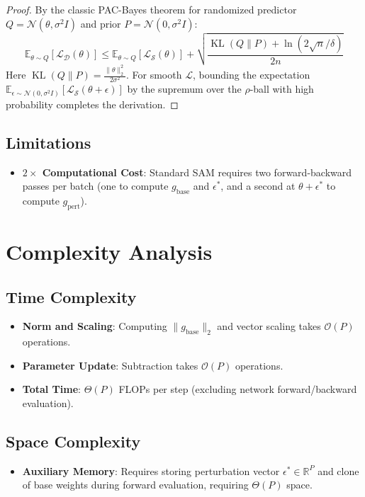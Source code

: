 \documentclass[11pt,a4paper]{article}
\theoremstyle{definition}
\begin{document}
\begin{proof}
By the classic PAC-Bayes theorem for randomized predictor $Q = \mathcal{N}(\theta, \sigma^2 I)$ and prior $P = \mathcal{N}(0, \sigma^2 I)$:
\begin{equation}
\mathbb{E}_{\theta \sim Q}[\mathcal{L}_{\mathcal{D}}(\theta)] \le \mathbb{E}_{\theta \sim Q}[\mathcal{L}_{\mathcal{S}}(\theta)] + \sqrt{\frac{\operatorname{KL}(Q \parallel P) + \ln(2\sqrt{n}/\delta)}{2n}}
\end{equation}
Here $\operatorname{KL}(Q \parallel P) = \frac{\|\theta\|_2^2}{2\sigma^2}$. For smooth $\mathcal{L}$, bounding the expectation $\mathbb{E}_{\epsilon \sim \mathcal{N}(0, \sigma^2 I)}[\mathcal{L}_{\mathcal{S}}(\theta + \epsilon)]$ by the supremum over the $\rho$-ball with high probability completes the derivation.
\end{proof}

\subsection{Limitations}
\begin{itemize}
    \item \textbf{$2\times$ Computational Cost}: Standard SAM requires two forward-backward passes per batch (one to compute $g_{\text{base}}$ and $\epsilon^*$, and a second at $\theta + \epsilon^*$ to compute $g_{\text{pert}}$).
\end{itemize}

\section{Complexity Analysis}

\subsection{Time Complexity}
\begin{itemize}
    \item \textbf{Norm and Scaling}: Computing $\|g_{\text{base}}\|_2$ and vector scaling takes $\mathcal{O}(P)$ operations.
    \item \textbf{Parameter Update}: Subtraction takes $\mathcal{O}(P)$ operations.
    \item \textbf{Total Time}: $\Theta(P)$ FLOPs per step (excluding network forward/backward evaluation).
\end{itemize}

\subsection{Space Complexity}
\begin{itemize}
    \item \textbf{Auxiliary Memory}: Requires storing perturbation vector $\epsilon^* \in \mathbb{R}^P$ and clone of base weights during forward evaluation, requiring $\Theta(P)$ space.
\end{itemize}
\end{document}
